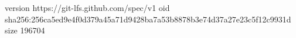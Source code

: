 version https://git-lfs.github.com/spec/v1
oid sha256:256ca5ed9e4f0d379a45a71d9428ba7a53b8878b3e74d37a27e23c5f12c9931d
size 196704
